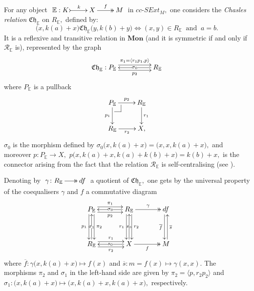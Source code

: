 \documentclass[a4paper]{amsart}
\makeatletter
\theoremstyle{plain}
\theoremstyle{definition}
\theoremstyle{remark}
\newcommand{\pullback}[4]{{#1 \leftindex_{#2}{\times}_{#3} #4}}
\newcommand{\rel}[1]{\mathcal{R}_{\mathbb{#1}}} %
\newcommand{\R}[1]{R_{\mathbb{E}}}
\renewcommand{\P}[1]{P_{\mathbb{E}}}
\newcommand{\Ch}[1]{\mathfrak{Ch}_{\mathbb{#1}}} %
\newcommand{\la}{\langle}
\newcommand{\ra}{\rangle}
\def\pullback{%
 \ar@{-}[]+R+<4pt,-3pt>;[]+RD+<4pt,-6pt>%
 \ar@{-}[]+D+<3pt,-6pt>;[]+RD+<4pt,-6pt>}
\makeatother
\begin{document}
For any object $\xymatrix{{\mathbb{E}:K} \ar@{>->}[r]^-{k} &X \ar@{->>}[r]^-{f} &M}$ in $cc\text{-}SExt_M,$ one considers the \emph{Chasles relation} $\Ch{E}$ on $R_{\mathbb{E}},$ defined by:
\begin{equation*}
\big(x,k(a)+x\big)\Ch{E}\big(y,k(b)+y\big) \Longleftrightarrow (x,y)\in R_{\mathbb{E}} \ \text{ and } \ a=b.
\end{equation*}
It is a reflexive and transitive relation in $\mathbf{Mon}$ (and it is symmetric if and only if $\rel{E}$ is), represented by the graph
\begin{equation*}
\xymatrixcolsep{4pc}
\xymatrix{\Ch{E}: \P{E} \ar@<.9ex>[r]^-{\pi_1=\la r_1p_1,p\ra} \ar@<-.9ex>[r]_-{p_2} &{\R{E}} \ar[l]|-{\sigma_0}}
\end{equation*}
where $P_{\mathbb{E}}$ is a pullback
\begin{equation*}
\xymatrix{
{\P{E}} \pullback \ar[r]^-{p_2} \ar[d]_-{p_1}  &{\R{E}} \ar[d]^-{r_1} \\
{\R{E}} \ar[r]_{r_2}  &{X,}
}
\end{equation*}
$\sigma_0$ is the morphism defined by $\sigma_0\big(x,k(a)+x\big)=\big(x,x,k(a)+x\big),$ and moreover $p:P_{\mathbb{E}}\longrightarrow X,$ $p\big(x,k(a)+x,k(a)+k(b)+x\big)=k(b)+x,$ is the connector arising from the fact that the relation $\rel{E}$ is self-centralising (see \cite[Proposition 5.7]{AMR}).

Denoting by $\xymatrixcolsep{1.5pc}\xymatrix{{\gamma\colon R_{\mathbb{E}}} \ar@{->>}[r] &{df}}$ a quotient of $\Ch{E},$ one gets by the universal property of the coequalisers $\gamma$ and $f$ a commutative diagram
\begin{equation*}
\xymatrixcolsep{3pc}
\xymatrixrowsep{3pc}
\xymatrix{
{\P{E}} \ar@<-.9ex>[d]_-{p_1} \ar@<.9ex>[d]^-{\pi_2} \ar@<.9ex>[r]^-{\pi_1} \ar@<-.9ex>[r]_-{p_2} &{\R{E}} \ar[l]|{\sigma_0} \ar@<-.9ex>[d]_-{r_1} \ar@<.9ex>[d]^-{r_2} \ar@{->>}[r]^-{\gamma} &{df} \ar@<-.5ex>[d]_-{\overline{f}}\\
{\R{E}} \ar[u]|{\sigma_1} \ar@<.9ex>[r]^-{r_1} \ar@<-.9ex>[r]_-{r_2} &{X} \ar[l]|{s_0} \ar[u]|{s_0} \ar@{->>}[r]_-f &M \ar@<-.5ex>[u]_-{\overline{s}}
}
\end{equation*}
where $\overline{f}\colon\gamma\big(x,k(a)+x\big)\mapsto f(x)$ and $\overline{s}\colon m=f(x)\mapsto\gamma(x,x).$ The morphisms $\pi_2$ and $\sigma_1$ in the left-hand side are given by $\pi_2=\la p,r_2p_2\ra$ and $\sigma_1\colon\big(x,k(a)+x\big)\mapsto\big(x,k(a)+x,k(a)+x\big),$ respectively.
\end{document}
